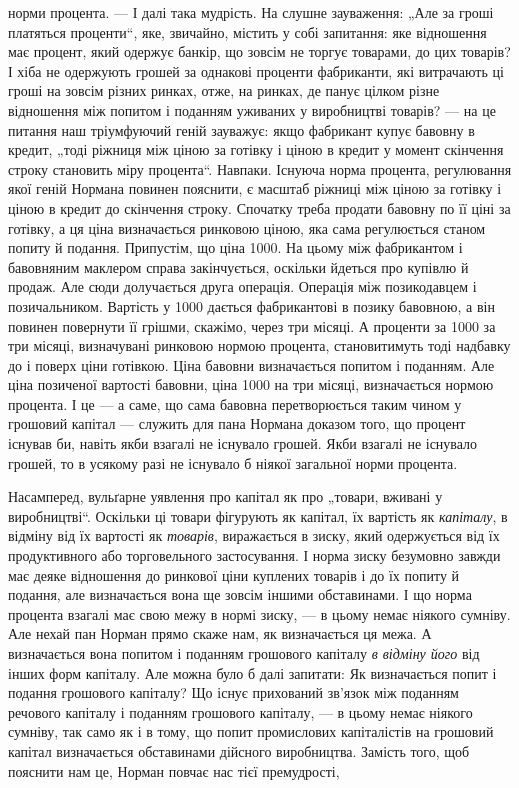 \parcont{}  %
норми процента. — І далі така мудрість. На слушне зауваження:
„Але за гроші платяться проценти“, яке, звичайно, містить у собі
запитання: яке відношення має процент, який одержує банкір,
що зовсім не торгує товарами, до цих товарів? І хіба не одержують грошей за однакові проценти
фабриканти, які витрачають
ці гроші на зовсім різних ринках, отже, на ринках, де панує
цілком різне відношення між попитом і поданням уживаних у виробництві товарів? — на це питання наш
тріумфуючий геній зауважує: якщо фабрикант купує бавовну в кредит, „тоді ріжниця між ціною за
готівку і ціною в кредит у момент скінчення строку становить міру процента“. Навпаки. Існуюча норма
процента, регулювання якої геній Нормана повинен пояснити, є масштаб ріжниці
між ціною за готівку і ціною в кредит до скінчення строку. Спочатку треба продати бавовну по її ціні
за готівку, а ця ціна визначається ринковою ціною, яка сама регулюється станом попиту
й подання. Припустім, що ціна \deq{} 1000. На цьому
між фабрикантом і бавовняним маклером справа закінчується,
оскільки йдеться про купівлю й продаж. Але сюди долучається
друга операція. Операція між позикодавцем і позичальником. Вартість у 1000 дається
фабрикантові в позику бавовною, а він повинен повернути її грішми, скажімо, через три місяці. А
проценти за 1000 за три місяці, визначувані
ринковою нормою процента, становитимуть тоді надбавку до і поверх ціни готівкою. Ціна бавовни
визначається попитом і поданням.
Але ціна позиченої вартості бавовни, ціна 1000 на
три місяці, визначається нормою процента. І це — а саме, що сама
бавовна перетворюється таким чином у грошовий капітал — служить для пана Нормана доказом того, що
процент існував би, навіть
якби взагалі не існувало грошей. Якби взагалі не існувало грошей,
то в усякому разі не існувало б ніякої загальної норми процента.

Насамперед, вульґарне уявлення про капітал як про „товари,
вживані у виробництві“. Оскільки ці товари фігурують як капітал, їх вартість як \emph{капіталу}, в відміну
від їх вартості як \emph{товарів}, виражається в зиску, який одержується від їх продуктивного або
торговельного застосування. І норма зиску безумовно
завжди має деяке відношення до ринкової ціни куплених товарів
і до їх попиту й подання, але визначається вона ще зовсім іншими
обставинами. І що норма процента взагалі має свою межу в нормі
зиску, — в цьому немає ніякого сумніву. Але нехай пан Норман
прямо скаже нам, як визначається ця межа. А визначається
вона попитом і поданням грошового капіталу \emph{в відміну його} від
інших форм капіталу. Але можна було б далі запитати: Як визначається попит і подання грошового
капіталу? Що існує прихований зв’язок між поданням речового капіталу і поданням грошового капіталу,
— в цьому немає ніякого сумніву, так само як
і в тому, що попит промислових капіталістів на грошовий капітал визначається обставинами дійсного
виробництва. Замість
того, щоб пояснити нам це, Норман повчає нас тієї премудрості,
\parbreak{}  %

